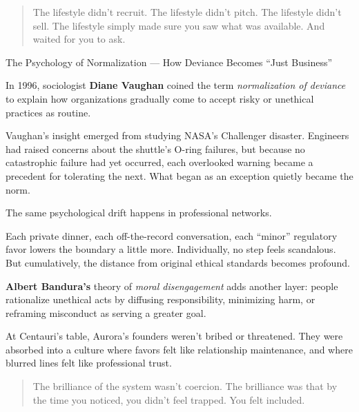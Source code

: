 \begin{quote}
The lifestyle didn’t recruit.  
The lifestyle didn’t pitch.  
The lifestyle didn’t sell.  
The lifestyle simply made sure you saw what was available.  
And waited for you to ask.
\end{quote}

\begin{PsychologicalSidebar}{The Psychology of Normalization --- How Deviance Becomes ``Just Business''}

  In 1996, sociologist \textbf{Diane Vaughan} coined the term \emph{normalization of deviance} to explain how 
  organizations gradually come to accept risky or unethical practices as routine.

  \medskip
  
  Vaughan’s insight emerged from studying NASA’s Challenger disaster. Engineers had raised concerns about the 
  shuttle’s O-ring failures, but because no catastrophic failure had yet occurred, each overlooked warning became 
  a precedent for tolerating the next. What began as an exception quietly became the norm.

  \medskip
  
  The same psychological drift happens in professional networks.

  \medskip
  
  Each private dinner, each off-the-record conversation, each “minor” regulatory favor lowers the boundary a little more. 
  Individually, no step feels scandalous. But cumulatively, the distance from original ethical standards becomes profound.

  \medskip
  
  \textbf{Albert Bandura’s} theory of \emph{moral disengagement} adds another layer: people rationalize unethical acts by 
  diffusing responsibility, minimizing harm, or reframing misconduct as serving a greater goal.

  \medskip
  
  At Centauri’s table, Aurora’s founders weren’t bribed or threatened. They were absorbed into 
  a culture where favors felt like relationship maintenance, and where blurred lines felt like professional trust.
  
  \begin{quote}
  The brilliance of the system wasn’t coercion.  The brilliance was that by the time you noticed, you didn’t feel trapped.  
  You felt included.
  \end{quote}
  
\end{PsychologicalSidebar}

\medskip